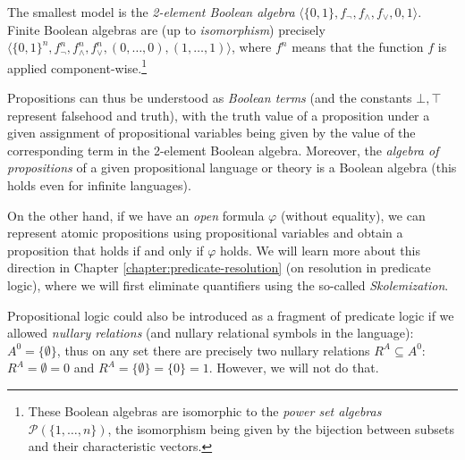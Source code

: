 The smallest model is the \emph{2-element Boolean algebra} $\langle \{0,1\},f_\neg,f_\land,f_\lor,0,1\rangle$. Finite Boolean algebras are (up to \emph{isomorphism}) precisely $\langle \{0,1\}^n,f_\neg^n,f_\land^n,f_\lor^n,(0,\dots,0),(1,\dots,1)\rangle$, where $f^n$ means that the function $f$ is applied component-wise.\footnote{These Boolean algebras are isomorphic to the \emph{power set algebras} $\mathcal P(\{1,\dots,n\})$, the isomorphism being given by the bijection between subsets and their characteristic vectors.}

Propositions can thus be understood as \emph{Boolean terms} (and the constants $\bot,\top$ represent falsehood and truth), with the truth value of a proposition under a given assignment of propositional variables being given by the value of the corresponding term in the 2-element Boolean algebra. Moreover, the \emph{algebra of propositions} of a given propositional language or theory is a Boolean algebra (this holds even for infinite languages).

On the other hand, if we have an \emph{open} formula $\varphi$ (without equality), we can represent atomic propositions using propositional variables and obtain a proposition that holds if and only if $\varphi$ holds. We will learn more about this direction in Chapter \ref{chapter:predicate-resolution} (on resolution in predicate logic), where we will first eliminate quantifiers using the so-called \emph{Skolemization}.

Propositional logic could also be introduced as a fragment of predicate logic if we allowed \emph{nullary relations} (and nullary relational symbols in the language): $A^0=\{\emptyset\}$, thus on any set there are precisely two nullary relations $R^A\subseteq A^0$: $R^A=\emptyset=0$ and $R^A=\{\emptyset\}=\{0\}=1$. However, we will not do that.


